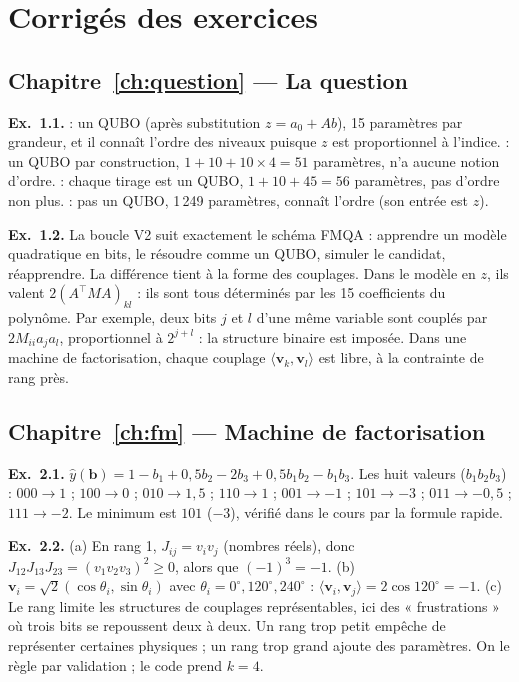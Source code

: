 \chapter{Corrigés des exercices}\label{annexe:corriges}

\section*{Chapitre~\ref{ch:question} — La question}
\textbf{Ex.~1.1.}  : un QUBO (après substitution $z=a_0+Ab$), 15 paramètres par grandeur, et il connaît l'ordre des niveaux puisque $z$ est proportionnel à l'indice.  : un QUBO par construction, $1+10+10\times4=51$ paramètres, n'a aucune notion d'ordre.  : chaque tirage est un QUBO, $1+10+45=56$ paramètres, pas d'ordre non plus.  : pas un QUBO, 1\,249 paramètres, connaît l'ordre (son entrée est $z$).

\textbf{Ex.~1.2.} La boucle V2 suit exactement le schéma FMQA : apprendre un modèle quadratique en bits, le résoudre comme un QUBO, simuler le candidat, réapprendre. La différence tient à la forme des couplages. Dans le modèle en $z$, ils valent $2(A^\top MA)_{kl}$ : ils sont tous déterminés par les 15 coefficients du polynôme. Par exemple, deux bits $j$ et $l$ d'une même variable sont couplés par $2M_{ii}a_ja_l$, proportionnel à $2^{j+l}$ : la structure binaire est imposée. Dans une machine de factorisation, chaque couplage $\langle\mathbf v_k,\mathbf v_l\rangle$ est libre, à la contrainte de rang près.

\section*{Chapitre~\ref{ch:fm} — Machine de factorisation}
\textbf{Ex.~2.1.} $\hat y(\mathbf b)=1-b_1+0{,}5b_2-2b_3+0{,}5b_1b_2-b_1b_3$. Les huit valeurs ($b_1b_2b_3$) : $000\to1$ ; $100\to0$ ; $010\to1{,}5$ ; $110\to1$ ; $001\to-1$ ; $101\to-3$ ; $011\to-0{,}5$ ; $111\to-2$. Le minimum est $101$ ($-3$), vérifié dans le cours par la formule rapide.

\textbf{Ex.~2.2.} (a) En rang 1, $J_{ij}=v_iv_j$ (nombres réels), donc $J_{12}J_{13}J_{23}=(v_1v_2v_3)^2\ge0$, alors que $(-1)^3=-1$. (b) $\mathbf v_i=\sqrt2(\cos\theta_i,\sin\theta_i)$ avec $\theta_i=0^\circ,120^\circ,240^\circ$ : $\langle\mathbf v_i,\mathbf v_j\rangle=2\cos120^\circ=-1$. (c) Le rang limite les structures de couplages représentables, ici des « frustrations » où trois bits se repoussent deux à deux. Un rang trop petit empêche de représenter certaines physiques ; un rang trop grand ajoute des paramètres. On le règle par validation ; le code prend $k=4$.

